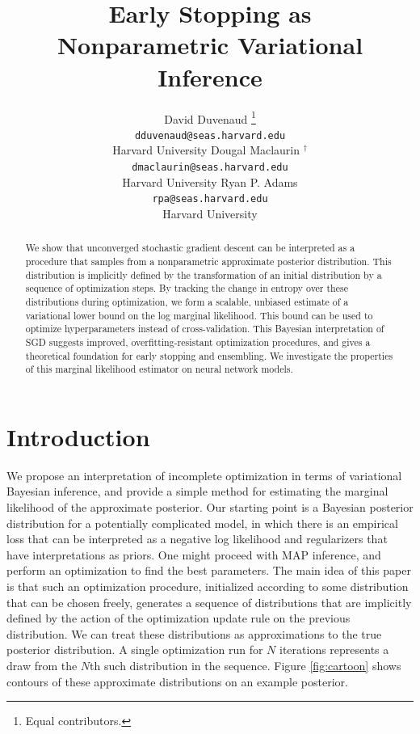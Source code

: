 \documentclass{article} %
\title{Early Stopping as \\ Nonparametric Variational Inference}
\author{
David Duvenaud \thanks{ \hspace{1em}Equal contributors.} \\
\texttt{dduvenaud@seas.harvard.edu} \\
Harvard University
\And
Dougal Maclaurin $^\dagger$ \\
\texttt{dmaclaurin@seas.harvard.edu} \\
Harvard University
\And
Ryan P. Adams \\
\texttt{rpa@seas.harvard.edu} \\
Harvard University
}
\begin{document}
\maketitle

\begin{abstract}
We show that unconverged stochastic gradient descent 
can be interpreted as a procedure that samples from a nonparametric approximate posterior distribution.
This distribution is implicitly defined by the transformation of an initial distribution by a sequence of optimization steps. 
By tracking the change in entropy over these distributions during optimization, we form a scalable, unbiased estimate of a variational lower bound on the log marginal likelihood.
This bound can be used to optimize hyperparameters instead of cross-validation.
This Bayesian interpretation of SGD suggests improved, overfitting-resistant optimization procedures, and gives a theoretical foundation for early stopping and ensembling.
We investigate the properties of this marginal likelihood estimator on neural network models.
\end{abstract}

\section{Introduction}



We propose an interpretation of incomplete optimization in terms of variational Bayesian inference, and provide a simple method for estimating the marginal likelihood of the approximate posterior.
Our starting point is a Bayesian posterior distribution for a potentially complicated model, in which there is an empirical loss that can be interpreted as a negative log likelihood and regularizers that have interpretations as priors.
One might proceed with MAP inference, and perform an optimization to find the best parameters.
The main idea of this paper is that such an optimization procedure, initialized according to some distribution that can be chosen freely, generates a sequence of distributions that are implicitly defined by the action of the optimization update rule on the previous distribution.
We can treat these distributions as  approximations to the true posterior distribution.
A single optimization run for $N$ iterations represents a draw from the $N$th such distribution in the sequence.
Figure \ref{fig:cartoon} shows contours of these approximate distributions on an example posterior.
\end{document}
